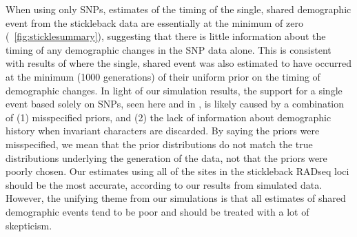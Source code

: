 \ifembed{

}{}

When using only SNPs, estimates of the timing of the single, shared demographic
event from the stickleback data are essentially at the minimum of zero
(\fig{}~\ref{fig:sticklesummary}),
suggesting that there is little information about the timing of any demographic
changes in the SNP data alone.
This is consistent with results of \citet{Xue2015} where the single, shared
event was also estimated to have occurred at the minimum (1000 generations) of
their uniform prior on the timing of demographic changes.
In light of our simulation results, the support for a single event based solely
on SNPs, seen here and in \citet{Xue2015}, is likely caused by a combination of
(1) misspecified priors, and
(2) the lack of information about demographic history when invariant characters
are discarded.
By saying the priors were misspecified, we mean that the prior distributions do
not match the true distributions underlying the generation of the data, not
that the priors were poorly chosen.
Our estimates using all of the sites in the stickleback RADseq loci should be
the most accurate, according to our results from simulated data.
However, the unifying theme from our simulations is that all estimates of
shared demographic events tend to be poor and should be treated with a lot of
skepticism.
